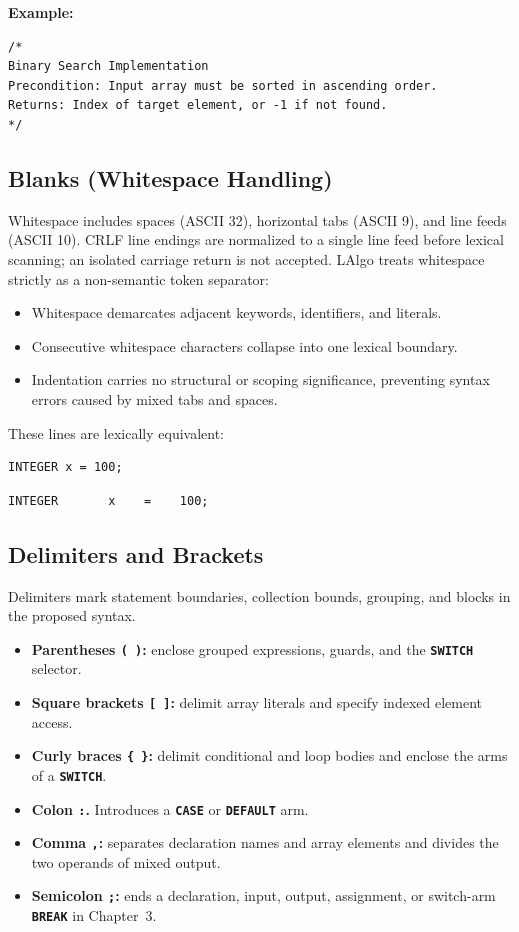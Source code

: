 \documentclass[11pt,a4paper]{article}
\newcommand{\kw}[1]{\texttt{\bfseries\color{pupmaroon}#1}}
\newcommand{\codeinline}[1]{\texttt{#1}}
\begin{document}
\textbf{Example:}
\begin{lstlisting}
/*
Binary Search Implementation
Precondition: Input array must be sorted in ascending order.
Returns: Index of target element, or -1 if not found.
*/
\end{lstlisting}

\subsection{Blanks (Whitespace Handling)}\label{sec:whitespace}

Whitespace includes spaces (ASCII 32), horizontal tabs (ASCII 9), and line feeds (ASCII 10). CRLF line endings are normalized to a single line feed before lexical scanning; an isolated carriage return is not accepted. LAlgo treats whitespace strictly as a non-semantic token separator:

\begin{itemize}
  \item Whitespace demarcates adjacent keywords, identifiers, and literals.
  \item Consecutive whitespace characters collapse into one lexical boundary.
  \item Indentation carries no structural or scoping significance, preventing syntax errors caused by mixed tabs and spaces.
\end{itemize}

These lines are lexically equivalent:

\begin{lstlisting}
INTEGER x = 100;
\end{lstlisting}
\begin{lstlisting}
INTEGER       x    =    100;
\end{lstlisting}

\subsection{Delimiters and Brackets}

Delimiters mark statement boundaries, collection bounds, grouping, and blocks in the proposed syntax.

\begin{itemize}
  \item \textbf{Parentheses \codeinline{( )}:} enclose grouped expressions, guards, and the \kw{SWITCH} selector.
  \item \textbf{Square brackets \codeinline{[ ]}:} delimit array literals and specify indexed element access.
  \item \textbf{Curly braces \codeinline{\{ \}}:} delimit conditional and loop bodies and enclose the arms of a \kw{SWITCH}.
  \item \textbf{Colon \codeinline{:}.} Introduces a \kw{CASE} or \kw{DEFAULT} arm.
  \item \textbf{Comma \codeinline{,}:} separates declaration names and array elements and divides the two operands of mixed output.
  \item \textbf{Semicolon \codeinline{;}:} ends a declaration, input, output, assignment, or switch-arm \kw{BREAK} in Chapter~3.
\end{itemize}
\end{document}
